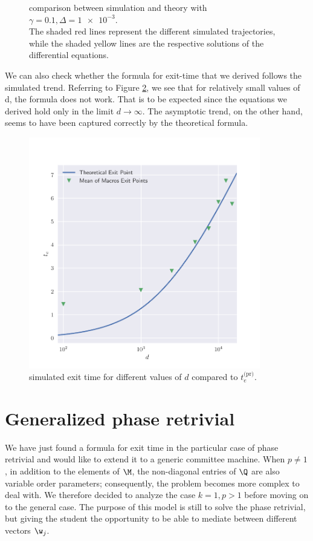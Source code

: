\begin{figure}
  \caption{
    comparison between simulation and theory with \(\gamma=\num{0.1}, \Delta=\num{1e-3}\).\\
    The shaded red lines represent the different simulated trajectories,
    while the shaded yellow lines are the respective solutions of the differential equations.
  }
  \label{fig:spherical-phase-retrivial-d10000}
\end{figure}
We can also check whether the formula for exit-time that we derived follows the simulated trend.
Referring to Figure \ref{fig:spherical-phase-retrivial-with-d}, we see that for relatively small values of d, the formula does not work.
That is to be expected since the equations we derived hold only in the limit \(d\to\infty\).
The asymptotic trend, on the other hand, seems to have been captured correctly by the theoretical formula.
\begin{figure}
  \centering
  \includegraphics[width=0.9\textwidth]{figures/spherical/phase-retrivial-dplot.pdf}
  \caption{
    simulated exit time for different values of \(d\) compared to \(t^\text{(pr)}_e\).
  }
  \label{fig:spherical-phase-retrivial-with-d}
\end{figure}

\section{Generalized phase retrivial} %
We have just found a formula for exit time in the particular case of phase retrivial and would like to extend it to a generic committee machine.
When \(p\neq1\), in addition to the elements of \(\M\), the non-diagonal entries of \(\Q\) are also variable order parameters;
consequently, the problem becomes more complex to deal with.
We therefore decided to analyze the case \(k=1,p>1\) before moving on to the general case.
The purpose of this model is still to solve the phase retrivial,
but giving the student the opportunity to be able to mediate between different vectors \(\w_j\).

